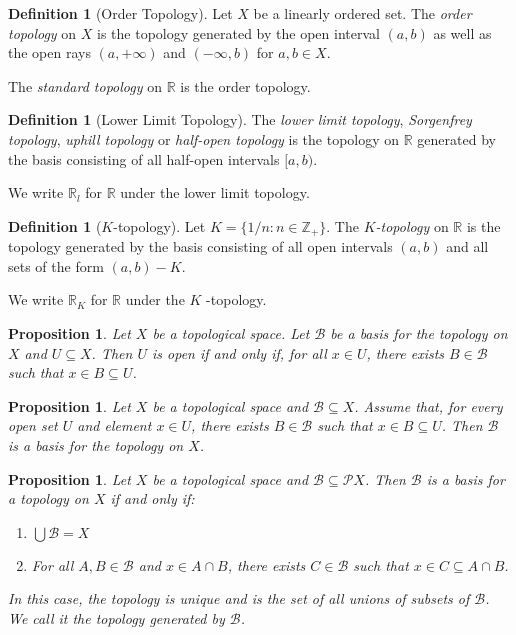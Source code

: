\documentclass{book}
\newtheorem{prop}[ax]{Proposition}
\theoremstyle{definition}
\newtheorem{df}[ax]{Definition}
\begin{document}
\begin{df}[Order Topology]
Let $X$ be a linearly ordered set. The \emph{order topology} on $X$ is the topology generated by the open interval $(a,b)$ as well as the open rays $(a, + \infty)$ and $(-\infty, b)$ for $a,b \in X$.

The \emph{standard topology} on $\mathbb{R}$ is the order topology.
\end{df}

\begin{df}[Lower Limit Topology]
The \emph{lower limit topology}, \emph{Sorgenfrey topology}, \emph{uphill topology} or \emph{half-open topology} is the topology on $\mathbb{R}$ generated by the basis consisting of all half-open intervals $[a,b)$.

We write $\mathbb{R}_l$ for $\mathbb{R}$ under the lower limit topology.
\end{df}

\begin{df}[$K$-topology]
Let $K = \{ 1/n : n \in \mathbb{Z}_+ \}$. The \emph{$K$-topology} on $\mathbb{R}$ is the topology generated by the basis consisting of all open intervals $(a,b)$ and all sets of the form $(a,b) - K$.

We write $\mathbb{R}_K$ for $\mathbb{R}$ under the $K$ -topology.
\end{df}

\begin{prop}
Let $X$ be a topological space. Let $\mathcal{B}$ be a basis for the topology on $X$ and $U \subseteq X$. Then $U$ is open if and only if, for all $x \in U$, there exists $B \in \mathcal{B}$ such that $x \in B \subseteq U$.
\end{prop}

\begin{prop}
Let $X$ be a topological space and $\mathcal{B} \subseteq X$. Assume that, for every open set $U$ and element $x \in U$, there exists $B \in \mathcal{B}$ such that $x \in B \subseteq U$. Then $\mathcal{B}$ is a basis for the topology on $X$.
\end{prop}

\begin{prop}
Let $X$ be a topological space and $\mathcal{B} \subseteq \mathcal{P} X$. Then $\mathcal{B}$ is a basis for a topology on $X$ if and only if:
\begin{enumerate}
\item $\bigcup \mathcal{B} = X$
\item For all $A, B \in \mathcal{B}$ and $x \in A \cap B$, there exists $C \in \mathcal{B}$ such that $x \in C \subseteq A \cap B$.
\end{enumerate}
In this case, the topology is unique and is the set of all unions of subsets of $\mathcal{B}$. We call it the topology \emph{generated} by $\mathcal{B}$.
\end{prop}
\end{document}
